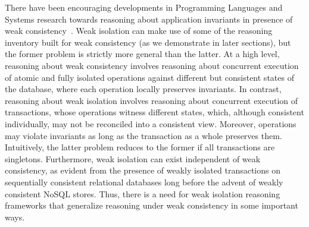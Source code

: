 There have been encouraging developments in Programming Languages and
Systems research towards reasoning about application invariants in
presence of weak consistency~\cite{burckhardt14, redblueosdi,
redblueatc, ecinec, gotsmanpopl16}. Weak isolation can make use of
some of the reasoning inventory built for weak consistency (as we
demonstrate in later sections), but the former problem is strictly
more general than the latter. At a high level, reasoning about weak
consistency involves reasoning about concurrent execution of atomic
and fully isolated operations against different but consistent states
of the database, where each operation locally preserves invariants. In
contrast, reasoning about weak isolation involves reasoning about
concurrent execution of transactions, whose operations witness
different states, which, although consistent individually, may not be
reconciled into a consistent view. Moreover, operations may violate
invariants as long as the transaction as a whole preserves them.
Intuitively, the latter problem reduces to the former if all
transactions are singletons. Furthermore, weak isolation can exist
independent of weak consistency, as evident from the presence of
weakly isolated transactions on sequentially consistent relational
databases long before the advent of weakly consistent NoSQL stores.
Thus, there is a need for weak isolation reasoning frameworks that
generalize reasoning under weak consistency in some important ways. 

